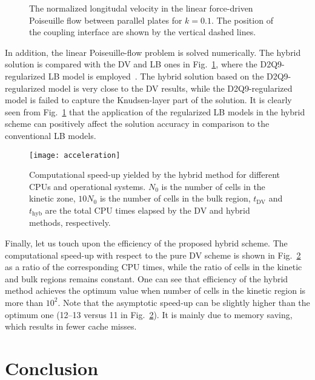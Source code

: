 \documentclass[]{elsarticle} %
\newcommand{\DV}{\mathrm{DV}}
\begin{document}
\begin{figure}
    \centering
    \relax %
    \caption{
        The normalized longitudal velocity in the linear force-driven Poiseuille flow between parallel plates for $k=0.1$.
        The position of the coupling interface are shown by the vertical dashed lines.
    }\label{fig:poiseuille}
\end{figure}

In addition, the linear Poiseuille-flow problem is solved numerically.
The hybrid solution is compared with the DV and LB ones in Fig.~\ref{fig:poiseuille},
where the D2Q9-regularized LB model is employed~\cite{Latt2006, Mont2015}.
The hybrid solution based on the D2Q9-regularized model is very close to the DV results,
while the D2Q9-regularized model is failed to capture the Knudsen-layer part of the solution.
It is clearly seen from Fig.~\ref{fig:poiseuille} that the application of the regularized LB models in the hybrid scheme
can positively affect the solution accuracy in comparison to the conventional LB models.

\begin{figure}
    \centering
    \texttt{[image: acceleration]}
    \caption{
        Computational speed-up yielded by the hybrid method for different CPUs and operational systems.
        $N_0$ is the number of cells in the kinetic zone, $10N_0$ is the number of cells in the bulk region,
        $t_\DV$ and $t_\mathrm{hyb}$ are the total CPU times elapsed by the DV and hybrid methods, respectively.
    }\label{fig:speed-up}
\end{figure}

Finally, let us touch upon the efficiency of the proposed hybrid scheme.
The computational speed-up with respect to the pure DV scheme is shown in Fig.~\ref{fig:speed-up} as a ratio of the corresponding CPU times,
while the ratio of cells in the kinetic and bulk regions remains constant.
One can see that efficiency of the hybrid method achieves the optimum value when number of cells in the kinetic region is more than $10^2$.
Note that the asymptotic speed-up can be slightly higher than the optimum one (12--13 versus 11 in Fig.~\ref{fig:speed-up}).
It is mainly due to memory saving, which results in fewer cache misses.

\section{Conclusion}\label{sec:summary}
\end{document}
